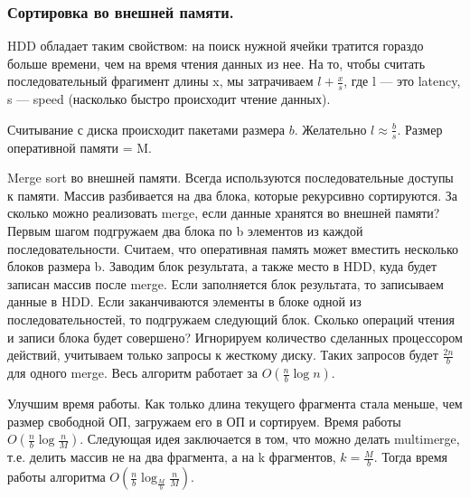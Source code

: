 \documentclass[a4paper, 12pt]{article}
\begin{document}
\subsubsection*{Сортировка во внешней памяти.}

HDD обладает таким свойством: на поиск нужной ячейки тратится гораздо больше времени, чем на время чтения данных из нее. На то, чтобы считать последовательный фрагимент длины x, мы затрачиваем $l+\frac{x}{s}$, где l --- это latency, s --- speed (насколько быстро происходит чтение данных).

Считывание с диска происходит пакетами размера $b$. Желательно  $l \approx \frac{b}{s}$. Размер оперативной памяти = M.

Merge sort во внешней памяти. Всегда используются последовательные доступы к памяти. Массив разбивается на два блока, которые рекурсивно сортируются. За сколько можно реализовать merge, если данные хранятся во внешней памяти? Первым шагом подгружаем два блока по b элементов из каждой последовательности.
Считаем, что оперативная память может вместить несколько блоков размера b. Заводим блок результата, а также место в HDD, куда будет записан массив после merge. Если заполняется блок результата, то записываем данные в HDD. Если заканчиваются элементы в блоке одной из последовательностей, то подгружаем следующий блок.
Сколько операций чтения и записи блока будет совершено? Игнорируем количество сделанных процессором действий, учитываем только запросы к жесткому диску. Таких запросов будет $\frac{2n}{b}$ для одного merge. Весь алгоритм работает за $O(\frac{n}{b} \log n)$.

Улучшим время работы. Как только длина текущего фрагмента стала меньше, чем размер свободной ОП, загружаем его в ОП и сортируем. Время работы $O(\frac{n}{b} \log \frac{n}{M})$. Следующая идея заключается в том, что можно делать multimerge, т.е. делить массив не на два фрагмента, а на k фрагментов, $k = \frac{M}{b}$.
Тогда время работы алгоритма $O(\frac{n}{b} \log_{\frac{M}{b}}\frac{n}{M})$.
\end{document}
